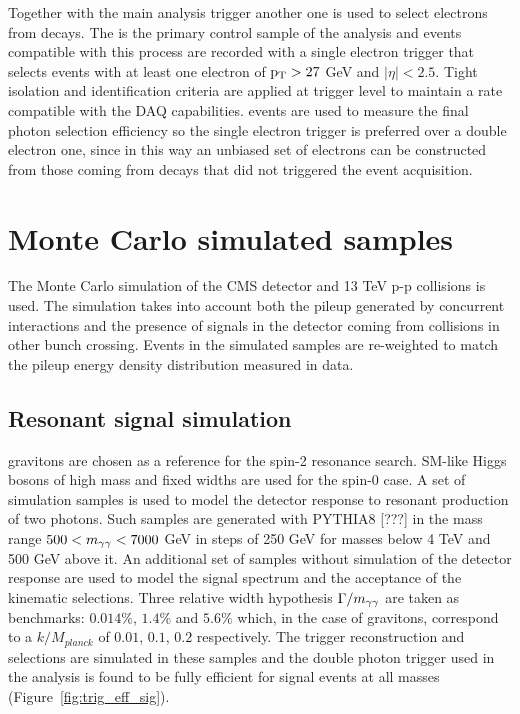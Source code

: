 Together with the main analysis trigger another one is used to select electrons from \Zee decays.
The \Zee is the primary control sample of the analysis and events compatible with this process
are recorded with a single electron trigger that selects events with at least one electron of
$\mathrm{p_{T}} > 27$ GeV and $|\eta| < 2.5$. Tight isolation and identification criteria are applied at trigger
level to maintain a rate compatible with the DAQ capabilities.
\Zee events are used to measure the final photon selection efficiency so the single electron trigger
is preferred over a double electron one, since in this way an unbiased set of electrons can be
constructed from those coming from \Zee decays that did not triggered the event acquisition.

\clearpage
\section{Monte Carlo simulated samples}
The Monte Carlo simulation of the CMS detector and 13 TeV p-p collisions is used. The simulation
takes into account both the pileup generated by concurrent interactions and the presence of
signals in the detector coming from collisions in other bunch crossing. Events in the simulated samples
are re-weighted to match the pileup energy density distribution measured in data.

\subsection{Resonant signal simulation}
\RS gravitons are chosen as a reference for the spin-2 resonance search. SM-like Higgs bosons of high mass and
fixed widths are used for the spin-0 case.
A set of simulation samples is used to model the detector response to resonant production of two photons.
Such samples are generated with PYTHIA8 [???] in the mass range $500 < m_{\gamma\gamma} < 7000$ GeV in steps of 250 GeV for
masses below 4 TeV and 500 GeV above it. An additional set of samples without simulation of the detector
response are used to model the signal spectrum and the acceptance of the kinematic selections.
Three relative width hypothesis $\Gamma/m_{\gamma\gamma}$ are taken as benchmarks: $0.014\%$, $1.4\%$ and $5.6\%$ which,
in the case of \RS gravitons, correspond to a $k/M_{planck}$ of $0.01$, $0.1$, $0.2$ respectively.
The trigger reconstruction and selections are simulated in these samples and the double photon trigger
used in the analysis is found to be fully efficient for signal events at all masses (Figure~\ref{fig:trig_eff_sig}).

